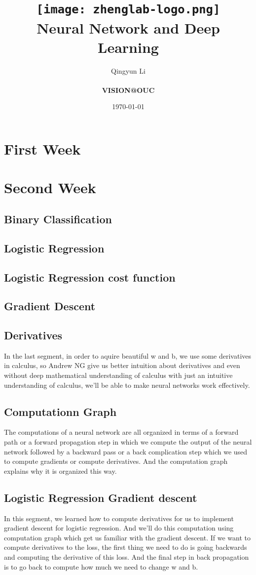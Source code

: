 \documentclass[a4paper]{article}
\title{
    \vspace*{1in}
    \texttt{[image: zhenglab-logo.png]} \\
    \vspace*{1.2in}
    \textbf{\huge Neural Network and Deep Learning}
    \vspace{0.2in}
}
\author{Qingyun Li \\
    \vspace*{0.5in} \\
    \textbf{VISION@OUC} \\
    \vspace*{1in}
}
\date{\today}
\begin{document}
\par
\maketitle
\setcounter{page}{0}
\thispagestyle{empty}
\newpage 
\section{First Week}
\section{Second Week}
\subsection{Binary Classification} 
\subsection{Logistic Regression}
\subsection{Logistic Regression cost function}
\subsection{Gradient Descent}
\subsection{Derivatives}
\par In the last segment, in order to aquire beautiful w and b, we use some derivatives in calculus, so Andrew NG give us better intuition about derivatives and even without deep mathematical understanding of calculus with just an intuitive understanding of calculus, we'll be able to make neural networks work effectively.
\subsection{Computationn Graph} 
\par The computations of a neural network are all organized in terms of a forward path or a forward propagation step in which we compute the output of the neural network followed by a backward pass or a back complication step which we used to compute gradients or compute derivatives. And the computation graph explains why it is organized this way.
\subsection{Logistic Regression Gradient descent}
\par In this segment, we learned how to compute derivatives for us to implement gradient descent for logistic regression. And we'll do this computation using computation graph which get us familiar with the gradient descent. If we want to compute derivatives to the loss, the first thing we need to do is going backwards and computing the derivative of this loss. And the final step in back propagation is to go back to compute how much we need to change w and b.
\end{document}
